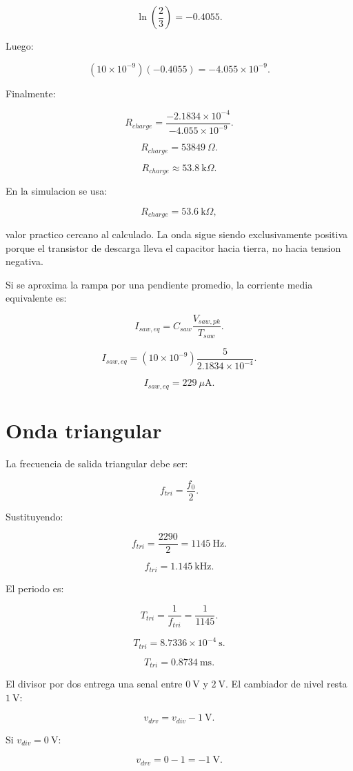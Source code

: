\documentclass[11pt,letterpaper]{article}
\begin{document}
\[
\ln\left(\frac{2}{3}\right)=-0.4055.
\]

Luego:

\[
(10\times 10^{-9})(-0.4055)
=
-4.055\times 10^{-9}.
\]

Finalmente:

\[
R_{charge}
=
\frac{-2.1834\times 10^{-4}}
{-4.055\times 10^{-9}}.
\]

\[
R_{charge}=53849~\Omega.
\]

\[
\boxed{R_{charge}\approx 53.8~\text{k}\Omega}.
\]

En la simulacion se usa:

\[
\boxed{R_{charge}=53.6~\text{k}\Omega},
\]

valor practico cercano al calculado. La onda sigue siendo exclusivamente
positiva porque el transistor de descarga lleva el capacitor hacia tierra, no
hacia tension negativa.

Si se aproxima la rampa por una pendiente promedio, la corriente media
equivalente es:

\[
I_{saw,eq}=C_{saw}\frac{V_{saw,pk}}{T_{saw}}.
\]

\[
I_{saw,eq}=
(10\times 10^{-9})\frac{5}{2.1834\times 10^{-4}}.
\]

\[
I_{saw,eq}=229~\mu\text{A}.
\]

\section{Onda triangular}

La frecuencia de salida triangular debe ser:

\[
f_{tri}=\frac{f_0}{2}.
\]

Sustituyendo:

\[
f_{tri}=\frac{2290}{2}=1145~\text{Hz}.
\]

\[
\boxed{f_{tri}=1.145~\text{kHz}}.
\]

El periodo es:

\[
T_{tri}=\frac{1}{f_{tri}}=\frac{1}{1145}.
\]

\[
T_{tri}=8.7336\times 10^{-4}~\text{s}.
\]

\[
T_{tri}=0.8734~\text{ms}.
\]

El divisor por dos entrega una senal entre \(0~\text{V}\) y \(2~\text{V}\). El
cambiador de nivel resta \(1~\text{V}\):

\[
v_{drv}=v_{div}-1~\text{V}.
\]

Si \(v_{div}=0~\text{V}\):

\[
v_{drv}=0-1=-1~\text{V}.
\]
\end{document}

